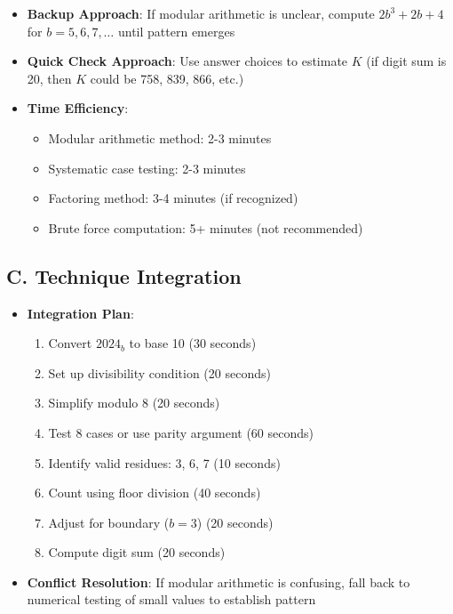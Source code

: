 \documentclass[11pt]{article}
\begin{document}
\begin{techniquesbox}
\begin{itemize}[leftmargin=*]
    \item \textbf{Backup Approach}: If modular arithmetic is unclear, compute $2b^3 + 2b + 4$ for $b = 5, 6, 7, \ldots$ until pattern emerges
    
    \item \textbf{Quick Check Approach}: Use answer choices to estimate $K$ (if digit sum is 20, then $K$ could be 758, 839, 866, etc.)
    
    \item \textbf{Time Efficiency}: 
    \begin{itemize}
        \item Modular arithmetic method: 2-3 minutes
        \item Systematic case testing: 2-3 minutes
        \item Factoring method: 3-4 minutes (if recognized)
        \item Brute force computation: 5+ minutes (not recommended)
    \end{itemize}
\end{itemize}

\subsection*{C. Technique Integration}
\begin{itemize}[leftmargin=*]
    \item \textbf{Integration Plan}:
    \begin{enumerate}
        \item Convert $2024_b$ to base 10 (30 seconds)
        \item Set up divisibility condition (20 seconds)
        \item Simplify modulo 8 (20 seconds)
        \item Test 8 cases or use parity argument (60 seconds)
        \item Identify valid residues: 3, 6, 7 (10 seconds)
        \item Count using floor division (40 seconds)
        \item Adjust for boundary ($b = 3$) (20 seconds)
        \item Compute digit sum (20 seconds)
    \end{enumerate}
    
    \item \textbf{Conflict Resolution}: If modular arithmetic is confusing, fall back to numerical testing of small values to establish pattern
\end{itemize}
\end{techniquesbox}
\end{document}
